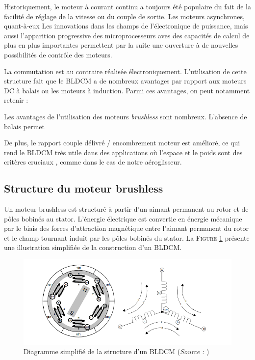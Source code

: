 		Historiquement, le moteur à courant continu a toujours été populaire du fait de la facilité de réglage de la vitesse ou du couple de sortie. Les moteurs asynchrones, quant-à-eux Les innovations dans les champs de l'électronique de puissance, mais aussi l'apparition progressive des microprocesseurs aves des capacités de calcul de plus en plus importantes permettent par la suite une ouverture à de nouvelles possibilités de contrôle des moteurs. 
		
		
		
		
	
	
	 La commutation est au contraire réalisée électroniquement. L'utilisation de cette structure fait que le BLDCM a de nombreux avantages par rapport aux moteurs DC à balais ou les moteurs à induction. Parmi ces avantages, on peut notamment retenir :
			
			
		Les avantages de l'utilisation des moteurs \textit{brushless} sont nombreux. L'absence de balais permet 
	
			
			De plus, le rapport couple délivré / encombrement moteur est amélioré, ce qui rend le BLDCM très utile dans des applications où l'espace et le poids sont des critères cruciaux \cite{AN885}, comme dans le cas de notre aéroglisseur.
			
	
			
			\subsection{Structure du moteur brushless}
			
				
				 Un moteur brushless est structuré à partir d'un aimant permanent au rotor et de pôles bobinés au stator. L'énergie électrique est convertie en énergie mécanique par le biais des forces d'attraction magnétique entre l'aimant permanent du rotor et le champ tournant induit par les pôles bobinés du stator. La \textsc{Figure \ref{struct_bldcm}} présente une illustration simplifiée de la construction d'un BLDCM. 
				 
				 \begin{figure}
				 	\begin{center}
				 		\includegraphics[scale=0.7]{../Illus/struct_bldcm.png}
				 	\end{center}
				 	\caption{Diagramme simplifié de la structure d'un BLDCM (\textit{Source :} \cite{AN857})}
				 	\label{struct_bldcm}
				 \end{figure}
				 
